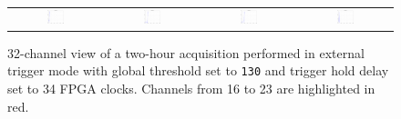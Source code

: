 \begin{figure}[hbt!]
\begin{tabular}{cccc}
        \includegraphics[width=0.204\textwidth]{Images/chap3/results/muons/ch_ext_trigger/incoming_energy_32channels_34_2hr_28.pdf} & \includegraphics[width=0.204\textwidth]{Images/chap3/results/muons/ch_ext_trigger/incoming_energy_32channels_34_2hr_29.pdf} & \includegraphics[width=0.204\textwidth]{Images/chap3/results/muons/ch_ext_trigger/incoming_energy_32channels_34_2hr_30.pdf} & \includegraphics[width=0.204\textwidth]{Images/chap3/results/muons/ch_ext_trigger/incoming_energy_32channels_34_2hr_31.pdf}\\
    \end{tabular}
    \caption{32-channel view of a two-hour acquisition performed in external trigger mode with global threshold set to \texttt{130} and trigger hold delay set to 34 FPGA clocks. Channels from 16 to 23 are highlighted in red.}
    \label{figMUON32channels}
\end{figure}